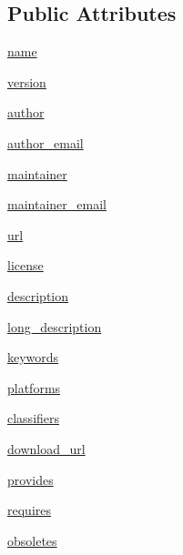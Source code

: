 \subsection*{Public Attributes}
\begin{DoxyCompactItemize}
\item 
\hyperlink{classsetuptools_1_1__distutils_1_1dist_1_1DistributionMetadata_a2901bac650b23bd6aceb9b1d78c6f913}{name}
\item 
\hyperlink{classsetuptools_1_1__distutils_1_1dist_1_1DistributionMetadata_af25f39507a02a8a27b1c7ed624d1f520}{version}
\item 
\hyperlink{classsetuptools_1_1__distutils_1_1dist_1_1DistributionMetadata_a2ea7b9b0615b27085318f58ac4ab9617}{author}
\item 
\hyperlink{classsetuptools_1_1__distutils_1_1dist_1_1DistributionMetadata_a61dcd42ef3bff18f372245ea6751cda5}{author\+\_\+email}
\item 
\hyperlink{classsetuptools_1_1__distutils_1_1dist_1_1DistributionMetadata_a4935fbd405c7fb009839aa5ca4621719}{maintainer}
\item 
\hyperlink{classsetuptools_1_1__distutils_1_1dist_1_1DistributionMetadata_a693ffd8aba917620e427569648720155}{maintainer\+\_\+email}
\item 
\hyperlink{classsetuptools_1_1__distutils_1_1dist_1_1DistributionMetadata_a33ad6bd58a58115067232e07fab3a7e6}{url}
\item 
\hyperlink{classsetuptools_1_1__distutils_1_1dist_1_1DistributionMetadata_a893899b647119a47e2614badb7379ffb}{license}
\item 
\hyperlink{classsetuptools_1_1__distutils_1_1dist_1_1DistributionMetadata_a98b7da2b7356fb2a6e200045c828053a}{description}
\item 
\hyperlink{classsetuptools_1_1__distutils_1_1dist_1_1DistributionMetadata_a087f4bc4b506472bf09549b8fbd947db}{long\+\_\+description}
\item 
\hyperlink{classsetuptools_1_1__distutils_1_1dist_1_1DistributionMetadata_ac3340cd24f496d05ee704134139093f9}{keywords}
\item 
\hyperlink{classsetuptools_1_1__distutils_1_1dist_1_1DistributionMetadata_aa45b55d2a36fd99c9174b9c941668a21}{platforms}
\item 
\hyperlink{classsetuptools_1_1__distutils_1_1dist_1_1DistributionMetadata_a5a6a9529ef94de900ff50ccbf0674e37}{classifiers}
\item 
\hyperlink{classsetuptools_1_1__distutils_1_1dist_1_1DistributionMetadata_aa9b6d67b9ae6421db04295f25d3c93a5}{download\+\_\+url}
\item 
\hyperlink{classsetuptools_1_1__distutils_1_1dist_1_1DistributionMetadata_a573a7e44b11411f42142c86d29405edb}{provides}
\item 
\hyperlink{classsetuptools_1_1__distutils_1_1dist_1_1DistributionMetadata_a4ea6a0551f0fcc8f5350c337c9e92fb9}{requires}
\item 
\hyperlink{classsetuptools_1_1__distutils_1_1dist_1_1DistributionMetadata_adac595d472f6816db4aaf3bee640e64b}{obsoletes}
\end{DoxyCompactItemize}
